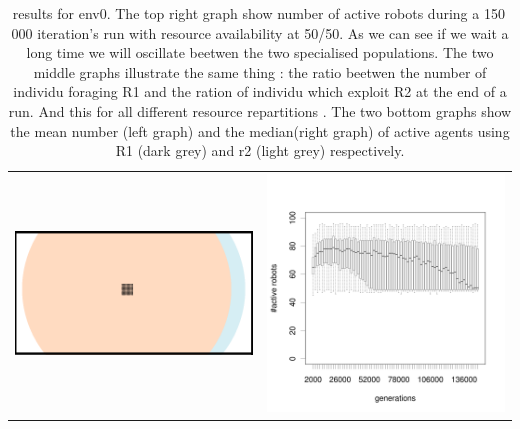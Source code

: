 \documentclass[a4paper,10pt]{article}
\begin{document}
\begin{table}[H]
\caption{results for env0. \newline 
The top right graph show number of active robots during a 150\,000 iteration's run with resource availability at 50/50. As we can see if we wait a long time we will oscillate beetwen the two specialised populations. 
\newline The two middle graphs illustrate the same thing : the ratio beetwen the number of individu foraging R1 and the ration of individu which exploit R2 at the end of a run. And this for all different resource repartitions .
\newline The two bottom graphs show the mean number (left graph) and the median(right graph) of active agents using R1 (dark grey) and r2 (light grey) respectively.}
\centering
\begin{tabular}{cc}
\includegraphics[width=\imgSize]{../images/5StaticEnv/environments/staticEnv0}&\includegraphics[width=\imgSize]{../images/5StaticEnv/alive_staticEnv0}\\

\end{tabular}
\end{table}
\end{document}
